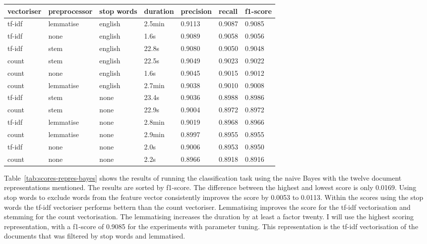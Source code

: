 \documentclass[11pt]{article}
\begin{document}
\begin{table*}[h]\footnotesize
\centering
\label{tab:scores-repres-bayes}
\begin{tabular}{ l l l l l l l }
vectoriser & preprocessor & stop words & duration & precision & recall & f1-score \\
\hline
tf-idf & lemmatise & english & 2.5min & 0.9113 & 0.9087 & 0.9085 \\
tf-idf & none & english & 1.6s & 0.9089 & 0.9058 & 0.9056 \\
tf-idf & stem & english & 22.8s & 0.9080 & 0.9050 & 0.9048 \\
count & stem & english & 22.5s & 0.9049 & 0.9023 & 0.9022 \\
count & none & english & 1.6s & 0.9045 & 0.9015 & 0.9012 \\
count & lemmatise & english & 2.7min & 0.9038 & 0.9010 & 0.9008 \\
tf-idf & stem & none & 23.4s & 0.9036 & 0.8988 & 0.8986 \\
count & stem & none & 22.9s & 0.9004 & 0.8972 & 0.8972 \\
tf-idf & lemmatise & none & 2.8min & 0.9019 & 0.8968 & 0.8966 \\
count & lemmatise & none & 2.9min & 0.8997 & 0.8955 & 0.8955 \\
tf-idf & none & none & 2.0s & 0.9006 & 0.8953 & 0.8950 \\
count & none & none & 2.2s & 0.8966 & 0.8918 & 0.8916 \\
\end{tabular}
\caption{scores for different representations and the naive Bayes classifier sorted by f1-score}
\end{table*}

Table~\ref{tab:scores-repres-bayes} shows the results of running the classification task using the naive Bayes with the twelve document representations mentioned. The results are sorted by f1-score. The difference between the highest and lowest score is only 0.0169. Using stop words to exclude words from the feature vector consistently improves the score by 0.0053 to 0.0113. Within the scores using the stop words the tf-idf vectoriser performs bettern than the count vectoriser. Lemmatising improves the score for the tf-idf vectorisation and stemming for the count vectorisation. The lemmatising increases the duration by at least a factor twenty. I will use the highest scoring representation, with a f1-score of 0.9085 for the experiments with parameter tuning. This representation is the tf-idf vectorisation of the documents that was filtered by stop words and lemmatised.
\end{document}
